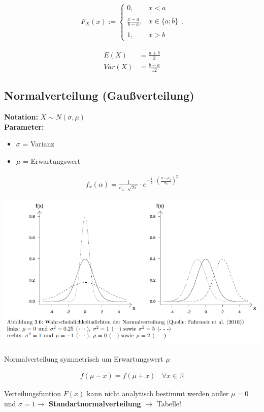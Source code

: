 \documentclass[10pt,a4paper]{article}
\begin{document}
  \begin{mdframed}[style=exercise]
    \begin{align}
        F_X(x):=\left\{
            \begin{array}{ll} 
                0, & x < a \\ \\
                \frac{x-a}{b-a}, & x \in \{a;b\} \\ \\
                1, & x > b 
            \end{array}
            \right. .
    \end{align}
  \end{mdframed}

  \begin{mdframed}[style=exercise]
    \begin{align}
        E(X) &= \frac{a+b}{2} \\
        Var(X) &= \frac{b-a}{12}
    \end{align}
  \end{mdframed}


  \newpage

\subsection{Normalverteilung (Gaußverteilung)}
\textbf{Notation:} $X \sim N(\sigma,\mu)$ \\
\textbf{Parameter:} \begin{itemize}
    \item $\sigma$ = Varianz
    \item $\mu$ = Erwartungswert
\end{itemize}
  \begin{mdframed}[style=exercise]
    \begin{align}
        f_x(\alpha) = \frac{1}{\sigma_x \cdot \sqrt{2\pi}} \cdot e^{-\frac{1}{2} \cdot \left( \frac{\alpha - \mu_x}{\sigma_x}\right)^2}
    \end{align}
  \end{mdframed}
      \begin{center}
          \includegraphics[width=.5\textwidth]{./img/norm.png}
      \end{center}
Normalverteilung symmetrisch um Erwartungswert $\mu$
  \begin{mdframed}[style=exercise]
    \begin{align}
        f(\mu - x) = f (\mu + x) \ \ \ \ \forall x \in \mathbb{R}
    \end{align}
  \end{mdframed}
Verteilungsfuntion $F(x)$ kann nicht analytisch bestimmt werden
außer $\mu = 0$ und $\sigma = 1\rightarrow$ \textbf{Standartnormalverteilung} 
$\rightarrow$ Tabelle!
\end{document}

